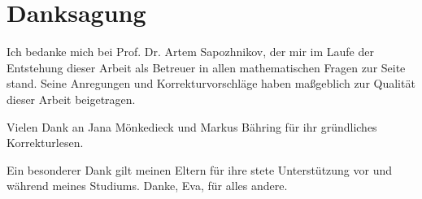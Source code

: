 \chapter*{Danksagung}
Ich bedanke mich bei Prof. Dr. Artem Sapozhnikov,
der mir im Laufe der {Entstehung} dieser Arbeit als Betreuer in allen mathematischen Fragen zur Seite stand.
Seine Anregungen und Korrekturvorschläge haben maßgeblich zur Qualität dieser Arbeit beigetragen.

Vielen Dank an Jana Mönkedieck und Markus Bähring für ihr gründliches Korrekturlesen.

Ein besonderer Dank gilt meinen Eltern für ihre stete Unterstützung vor und während meines Studiums.
Danke, Eva, für alles andere.